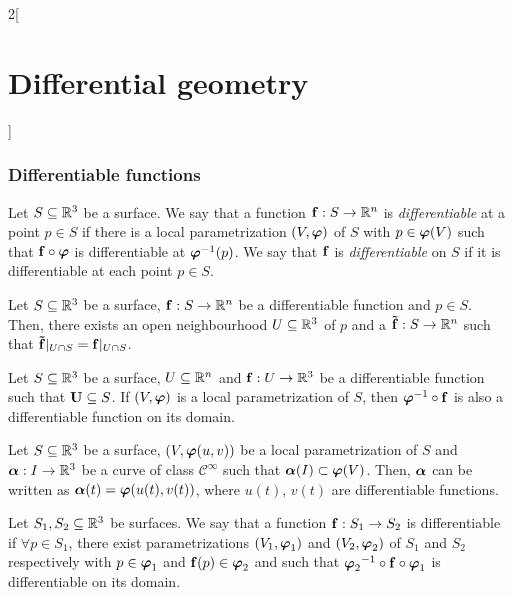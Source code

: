 \documentclass[../../../main.tex]{subfiles}
\begin{document}
\begin{multicols}{2}[\section{Differential geometry}]
  \subsubsection{Differentiable functions}
  \begin{definition}
    Let $S\subseteq\mathbb{R}^3$ be a surface. We say that a function $\boldsymbol{\mathrm{f}}:S\rightarrow \mathbb{R}^n$ is \emph{differentiable} at a point $p\in S$ if there is a local parametrization $(V,\boldsymbol{\mathrm{\varphi}})$ of $S$ with $p\in\boldsymbol{\mathrm{\varphi}}(V)$ such that $\boldsymbol{\mathrm{f}}\circ\boldsymbol{\mathrm{\varphi}}$ is differentiable at ${\boldsymbol{\mathrm{\varphi}}}^{-1}(p)$. We say that $\boldsymbol{\mathrm{f}}$ is \emph{differentiable} on $S$ if it is differentiable at each point $p\in S$.
  \end{definition}
  \begin{proposition}
    Let $S\subseteq\mathbb{R}^3$ be a surface, $\boldsymbol{\mathrm{f}}:S\rightarrow \mathbb{R}^n$ be a differentiable function and $p\in S$. Then, there exists an open neighbourhood $U\subseteq\mathbb{R}^3$ of $p$ and a $\boldsymbol{\mathrm{\tilde{f}}}:S\rightarrow \mathbb{R}^n$ such that $\boldsymbol{\mathrm{\tilde{f}}}|_{U\cap S}=\boldsymbol{\mathrm{f}}|_{U\cap S}$.
  \end{proposition}
  \begin{corollary}
    Let $S\subseteq\mathbb{R}^3$ be a surface, $U\subseteq \mathbb{R}^n$ and $\boldsymbol{\mathrm{f}}:U\rightarrow \mathbb{R}^3$ be a differentiable function such that $\boldsymbol{\mathrm{U}}\subseteq S$. If $(V,\boldsymbol{\mathrm{\varphi}})$ is a local parametrization of $S$, then ${\boldsymbol{\mathrm{\varphi}}}^{-1}\circ\boldsymbol{\mathrm{f}}$ is also a differentiable function on its domain.
  \end{corollary}
  \begin{corollary}
    Let $S\subseteq\mathbb{R}^3$ be a surface, $(V,\boldsymbol{\mathrm{\varphi}}(u,v))$ be a local parametrization of $S$ and $\boldsymbol{\mathrm{\alpha}}:I\rightarrow\mathbb{R}^3$ be a curve of class $\mathcal{C}^\infty$ such that $\boldsymbol{\mathrm{\alpha}}(I)\subset \boldsymbol{\mathrm{\varphi}}(V)$. Then, $\boldsymbol{\mathrm{\alpha}}$ can be written as $\boldsymbol{\mathrm{\alpha}}(t)=\boldsymbol{\mathrm{\varphi}}(u(t),v(t))$, where $u(t)$, $v(t)$ are differentiable functions.
  \end{corollary}
  \begin{definition}
    Let $S_1,S_2\subseteq\mathbb{R}^3$ be surfaces. We say that a function $\boldsymbol{\mathrm{f}}:S_1\rightarrow S_2$ is differentiable if $\forall p\in S_1$, there exist parametrizations $(V_1,\boldsymbol{\mathrm{\varphi}}_1)$ and $(V_2,\boldsymbol{\mathrm{\varphi}}_2)$ of $S_1$ and $S_2$ respectively with $p\in\boldsymbol{\mathrm{\varphi}}_1$ and $\boldsymbol{\mathrm{f}}(p)\in\boldsymbol{\mathrm{\varphi}}_2$ and such that ${\boldsymbol{\mathrm{\varphi}}_2}^{-1}\circ\boldsymbol{\mathrm{f}}\circ\boldsymbol{\mathrm{\varphi}}_1$ is differentiable on its domain.
  \end{definition}

\end{multicols}
\end{document}
